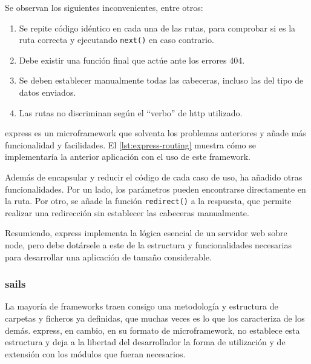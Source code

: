 \documentclass[main]{subfiles}
\begin{document}
\begin{listing}
  \label{lst:connect-routing}
\end{listing}


Se observan los siguientes inconvenientes, entre otros:
\begin{enumerate}
  \item Se repite código idéntico en cada una de las rutas, para comprobar si es la ruta correcta y ejecutando \texttt{next()} en caso contrario.
  \item Debe existir una función final que actúe ante los errores 404.
  \item Se deben establecer manualmente todas las cabeceras, incluso las del tipo de datos enviados.
  \item Las rutas no discriminan según el \enquote{verbo} de \gls{http} utilizado.
\end{enumerate}

\Gls{express} es un \gls{microframework} que solventa los problemas anteriores y añade más funcionalidad y facilidades. El \cref{lst:express-routing} muestra cómo se implementaría la anterior aplicación con el uso de este \gls{framework}.

\begin{listing}
  \label{lst:express-routing}
\end{listing}

Además de encapsular y reducir el código de cada caso de uso, ha añadido otras funcionalidades. Por un lado, los parámetros pueden encontrarse directamente en la ruta. Por otro, se añade la función \texttt{redirect()} a la respuesta, que permite realizar una redirección sin establecer las cabeceras manualmente.

Resumiendo, \gls{express} implementa la lógica esencial de un servidor web sobre \gls{node}, pero debe dotársele a este de la estructura y funcionalidades necesarias para desarrollar una aplicación de tamaño considerable.

\subsubsection[Sails.js]{\Gls{sails}}
La mayoría de \glspl{framework} traen consigo una metodología y estructura de carpetas y ficheros ya definidas, que muchas veces es lo que los caracteriza de los demás. \Gls{express}, en cambio, en su formato de \gls{microframework}, no establece esta estructura y deja a la libertad del desarrollador la forma de utilización y de extensión con los módulos que fueran necesarios.
\end{document}
